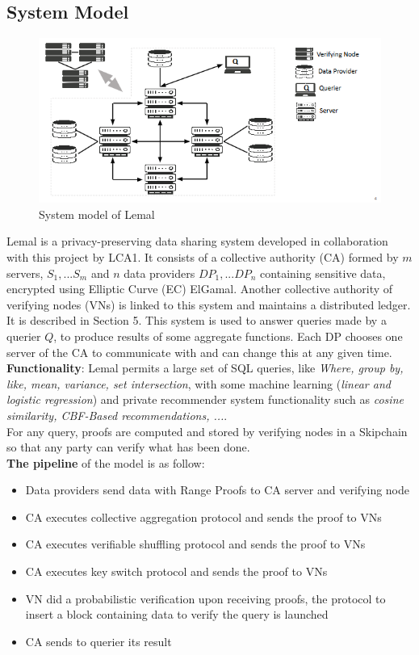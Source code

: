 \documentclass{article}
\begin{document}
\subsection{System Model}
\begin{figure}[H]
\center
\includegraphics[scale=0.75]{img/lemal.png}
\caption{System model of Lemal}
\end{figure}
Lemal is a privacy-preserving data sharing system developed in collaboration with this project by LCA1. It consists of a collective authority (CA) formed by $m$ servers, $S_1,...S_m$ and $n$ data providers $DP_1,...DP_n$ containing sensitive data, encrypted using Elliptic Curve (EC) ElGamal.
Another collective authority of verifying nodes (VNs) is linked to this system and maintains a distributed ledger. It is described in Section 5. This system is used to answer queries made by a querier $Q$, to produce results of some aggregate functions. Each DP chooses one server of the CA to communicate with and can change this at any given time.\\
\textbf{Functionality}: Lemal permits a large set of SQL queries, like \textit{Where, group by, like, mean, variance, set intersection}, with some machine learning (\textit{linear and logistic regression}) and private recommender system functionality such as \textit{cosine similarity, CBF-Based recommendations, ...}.\\
For any query, proofs are computed and stored by verifying nodes in a Skipchain so that any party can verify what has been done.\\
\textbf{The pipeline} of the model is as follow:
\begin{itemize}
\item{Data providers send data with Range Proofs to CA server and verifying node}
\item{CA executes collective aggregation protocol and sends the proof to VNs}
\item{CA executes verifiable shuffling protocol and sends the proof to VNs}
\item{CA executes key switch protocol and sends the proof to VNs}
\item{VN did a probabilistic verification upon receiving proofs, the protocol to insert a block containing data to verify the query is launched}
\item{CA sends to querier its result}
\end{itemize}
\end{document}
